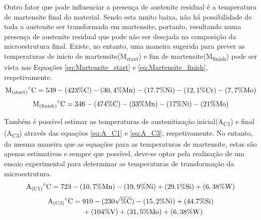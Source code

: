 \par
Outro fator que pode influenciar a presença de austenite residual é a temperatura de martensite final do material. Sendo esta muito baixa, não há possibilidade de toda a austenite ser transformada em martensite, portanto, resultando numa presença de austenite residual que pode não ser desejada na composição da microestrutura final. Existe, no entanto, uma maneira sugerida para prever as temperaturas de inicio de martensite(M\textsubscript{start}) e fim de martensite(M\textsubscript{finish}) pode ser vista nas Equações \ref{eq:Martensite_start} e \ref{eq:Martensite_finish}, respetivamente\cite{Honeycombe1995}.
\begin{equation}
    \label{eq:Martensite_start}
    \mathrm{M\textsubscript{(start)}}^{\circ}\mathrm{C} = 539-(423\%\mathrm{C})-(30,4\%\mathrm{Mn})-(17.7\%\mathrm{Ni})-(12,1\%\mathrm{Cr})-(7,7\%\mathrm{Mo})
\end{equation}
\begin{equation}
    \label{eq:Martensite_finish}
    \mathrm{M\textsubscript{(finish)}}^{\circ}\mathrm{C} = 346 - (474\%\mathrm{C}) - (33\%\mathrm{Mn}) - (17\%\mathrm{Ni}) - (21\%\mathrm{Mo})
\end{equation}
\newpage
\par
Também é possível estimar as temperaturas de austenitização inicial(A\textsubscript{C1}) e final (A\textsubscript{C3}) através das equações \ref{eq:A_C1} e \ref{eq:A_C3}, respetivamente\cite{Platl2020}. No entanto, da mesma maneira que as equações para as temperaturas de martensite, estas são apenas estimativas e sempre que possível, deve-se optar pela realização de um ensaio experimental para determinar as temperaturas de transformação da microestrutura.
\begin{equation}
    \label{eq:A_C1}
    \mathrm{A\textsubscript{(C1)}}^{\circ}\mathrm{C} = 723 - (10,7\%\mathrm{Mn}) - (19,9\%\mathrm{Ni}) + (29.1\%\mathrm{Si}) + (6,38\%\mathrm{W})
\end{equation}
\begin{equation}
    \label{eq:A_C3}
    \begin{aligned}
    \mathrm{A\textsubscript{(C3)}}^{\circ}\mathrm{C} = {}   & 910 - (230\sqrt{\%\mathrm{C}}) - (15,2\%\mathrm{Ni}) + (44.7\%\mathrm{Si})\\
                                                            & + (104\%\mathrm{V}) + (31,5\%\mathrm{Mo}) + (6,38\%\mathrm{W})
\end{aligned}
\end{equation}
